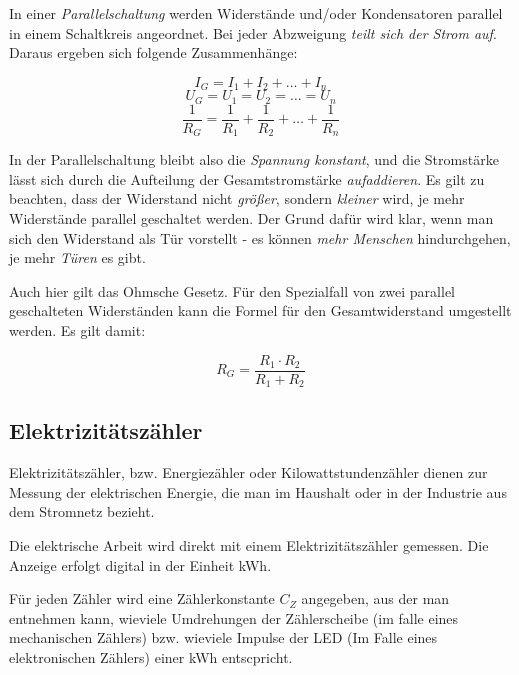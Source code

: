 \documentclass[a4paper, 12pt]{report}
\begin{document}
In einer \emph{Parallelschaltung} werden Widerstände und/oder Kondensatoren 
parallel in einem Schaltkreis angeordnet. Bei jeder Abzweigung \emph{teilt 
sich der Strom auf}. Daraus ergeben sich folgende Zusammenhänge:

\begin{center}
    \begin{equation}
        I_G = I_1 + I_2 + \dots + I_n
    \end{equation}
    \begin{equation}
        U_G = U_1 = U_2 = \dots = U_n
    \end{equation}
    \begin{equation}
        \frac{1}{R_G} = \frac{1}{R_1} + \frac{1}{R_2} + \dots + \frac{1}{R_n} 
    \end{equation}
\end{center}

In der Parallelschaltung bleibt also die \emph{Spannung konstant}, und die
Stromstärke lässt sich durch die Aufteilung der Gesamtstromstärke 
\emph{aufaddieren}. Es gilt zu beachten, dass der Widerstand nicht \emph{größer}, 
sondern \emph{kleiner} wird, je mehr Widerstände parallel geschaltet werden. 
Der Grund dafür wird klar, wenn man sich den Widerstand als Tür vorstellt - es
können \emph{mehr Menschen} hindurchgehen, je mehr \emph{Türen} es gibt. 

Auch hier gilt das Ohmsche Gesetz. Für den Spezialfall von zwei parallel
geschalteten Widerständen kann die Formel für den Gesamtwiderstand umgestellt 
werden. Es gilt damit: 
\begin{center}
    \begin{equation}
        R_G = \frac{R_1 \cdot R_2}{R_1 + R_2}
    \end{equation}
\end{center}

\subsection{Elektrizitätszähler}

Elektrizitätszähler, bzw. Energiezähler oder Kilowattstundenzähler dienen zur 
Messung der elektrischen Energie, die man im Haushalt oder in der Industrie
aus dem Stromnetz bezieht. 

Die elektrische Arbeit wird direkt mit einem Elektrizitätszähler gemessen. 
Die Anzeige erfolgt digital in der Einheit kWh. 

Für jeden Zähler wird eine Zählerkonstante $C_Z$ angegeben, aus der man
entnehmen kann, wieviele Umdrehungen der Zählerscheibe (im falle eines 
mechanischen Zählers) bzw. wieviele Impulse der LED (Im Falle eines 
elektronischen Zählers) einer kWh entscpricht. 
\end{document}
